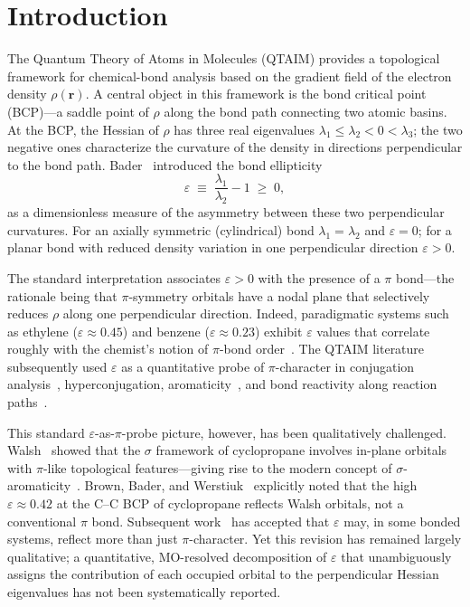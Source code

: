 \documentclass[11pt,a4paper]{article}
\newcommand{\eps}{\varepsilon}
\begin{document}
\section{Introduction}
\label{sec:intro}

The Quantum Theory of Atoms in Molecules (QTAIM)
\citep{Bader1990,Popelier2000} provides a topological framework for
chemical-bond analysis based on the gradient field of the electron
density $\rho(\mathbf{r})$. A central object in this framework is the
bond critical point (BCP)---a saddle point of $\rho$ along the bond
path connecting two atomic basins. At the BCP, the Hessian of $\rho$
has three real eigenvalues $\lambda_1 \le \lambda_2 < 0 < \lambda_3$;
the two negative ones characterize the curvature of the density in
directions perpendicular to the bond path. Bader~\citep{Bader1983}
introduced the bond ellipticity
\begin{equation}
\eps \;\equiv\; \frac{\lambda_1}{\lambda_2} - 1 \;\ge\; 0,
\label{eq:eps_def}
\end{equation}
as a dimensionless measure of the asymmetry between these two
perpendicular curvatures. For an axially symmetric (cylindrical) bond
$\lambda_1 = \lambda_2$ and $\eps = 0$; for a planar bond with reduced
density variation in one perpendicular direction $\eps > 0$.

The standard interpretation associates $\eps > 0$ with the presence of
a $\pi$ bond---the rationale being that $\pi$-symmetry orbitals have a
nodal plane that selectively reduces $\rho$ along one perpendicular
direction. Indeed, paradigmatic systems such as ethylene
($\eps \approx 0.45$) and benzene ($\eps \approx 0.23$) exhibit
$\eps$ values that correlate roughly with the chemist's notion of
$\pi$-bond order~\citep{Bader1983,Cremer1984,Popelier2000}. The
QTAIM literature subsequently used $\eps$ as a quantitative probe of
$\pi$-character in conjugation analysis~\citep{Cremer1988},
hyperconjugation, aromaticity~\citep{Matta2003}, and bond reactivity
along reaction paths~\citep{Mitra2012}.

This standard $\eps$-as-$\pi$-probe picture, however, has been
qualitatively challenged. Walsh~\citep{Walsh1947} showed that the
$\sigma$ framework of cyclopropane involves in-plane orbitals with
$\pi$-like topological features---giving rise to the modern concept
of $\sigma$-aromaticity~\citep{Cremer1988,Dewar1984}. Brown, Bader,
and Werstiuk~\citep{Brown2009} explicitly noted that the high
$\eps \approx 0.42$ at the C--C BCP of cyclopropane reflects Walsh
orbitals, not a conventional $\pi$ bond. Subsequent
work~\citep{Gao2009,Suthar2023,Popelier2018} has accepted that
$\eps$ may, in some bonded systems, reflect more than just
$\pi$-character. Yet this revision has remained largely
qualitative; a quantitative, MO-resolved decomposition of $\eps$ that
unambiguously assigns the contribution of each occupied orbital to
the perpendicular Hessian eigenvalues has not been systematically
reported.
\end{document}
